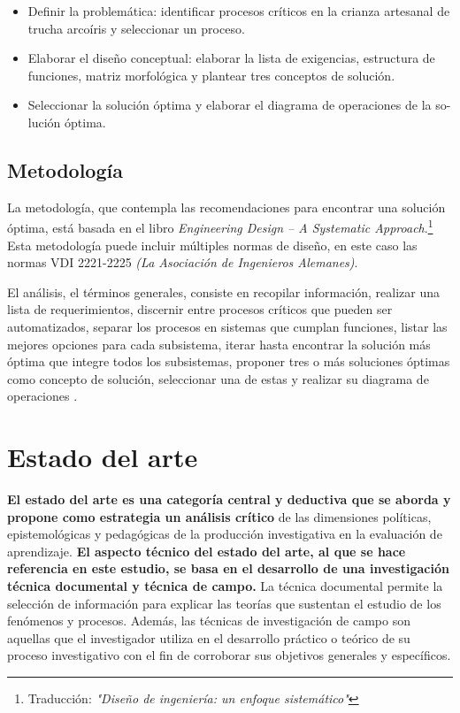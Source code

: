 \begin{itemize}
	\item Definir la problemática: identificar procesos críticos en la crianza artesanal de trucha arcoíris y seleccionar un proceso.
	\item Elaborar el diseño conceptual: elaborar la lista de exigencias, estructura de funciones, matriz morfológica y plantear tres conceptos de solución.
	\item Seleccionar la solución óptima y elaborar el diagrama de operaciones de la so-lución óptima. 
\end{itemize}

\subsection{Metodología}

La metodología, que contempla las recomendaciones para encontrar una solución óptima, está basada en el libro \textit{Engineering Design – A Systematic Approach}.\footnote{Traducción: \textit{"Diseño de ingeniería: un enfoque sistemático"}}  Esta metodología puede incluir múltiples normas de diseño, en este caso las normas VDI 2221-2225 \textit{(La Asociación de Ingenieros Alemanes)}.

El análisis, el términos generales, consiste en recopilar información, realizar una lista de requerimientos, discernir entre procesos críticos que pueden ser automatizados, separar los procesos en sistemas que cumplan funciones, listar las mejores opciones para cada subsistema, iterar hasta encontrar la solución más óptima que integre todos los subsistemas, proponer tres o más soluciones óptimas como concepto de solución, seleccionar una de estas y realizar su diagrama de operaciones .

\section{Estado del arte}
\textbf{El estado del arte es una categoría central y deductiva que se aborda y propone como estrategia un análisis crítico} de las dimensiones políticas, epistemológicas y pedagógicas de la producción investigativa en la evaluación de aprendizaje.\citep{GuevaraPatino2016} \textbf{El aspecto técnico del estado del arte, al que se hace referencia en este estudio, se basa en el desarrollo de una investigación técnica documental y técnica de campo.} La técnica documental permite la selección de información para explicar las teorías que sustentan el estudio de los fenómenos y procesos.\citep{Martinez2003} Además, las técnicas de investigación de campo son aquellas que el investigador utiliza en el desarrollo práctico o teórico de su proceso investigativo con el fin de corroborar sus objetivos generales y específicos.\citep{GuevaraPatino2016}

